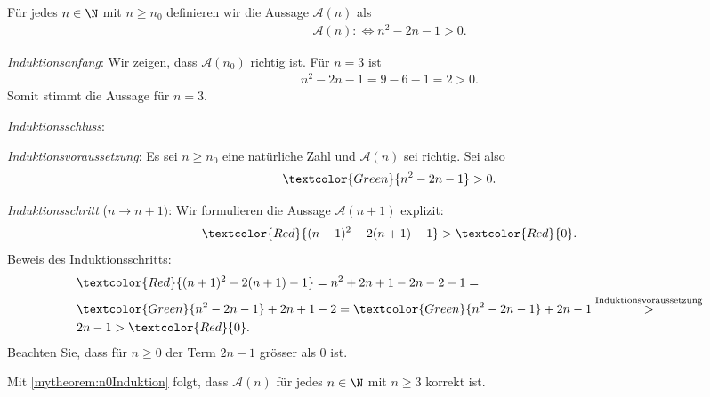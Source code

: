 \clearpage
\begin{myanswer}[myexercise:0292]
	Für jedes $n\in\N$ mit $n\geq n_0$ definieren wir die Aussage $\mathcal{A}(n)$ als
	\begin{align*}
		\mathcal{A}(n) :\iff n^2-2n-1 > 0.
	\end{align*}
	\begin{aenum}
		\item \textit{Induktionsanfang}: Wir zeigen, dass $\mathcal{A}(n_0)$ richtig ist. Für $n=3$ ist
		\begin{align*}
			n^2-2n-1 = 9-6-1 = 2 > 0.
		\end{align*}
		Somit stimmt die Aussage für $n=3$.
		\item \textit{Induktionsschluss}:
		\begin{renum}
			\item \textit{Induktionsvoraussetzung}: Es sei $n\geq n_0$ eine natürliche Zahl und $\mathcal{A}(n)$ sei richtig. Sei also
			\begin{align*}
				\textcolor{Green}{n^2-2n-1} > 0.
			\end{align*}
			\item \textit{Induktionsschritt} ($n\to n+1)$: Wir formulieren die Aussage $\mathcal{A}(n+1)$ explizit:
				\begin{align*}
					\textcolor{Red}{(n+1)^2-2(n+1)-1} > \textcolor{Red}{0}.
				\end{align*}
				Beweis des Induktionsschritts:
				\begin{align*}
					 & \textcolor{Red}{(n+1)^2-2(n+1)-1} = n^2 + 2n + 1 - 2n - 2 - 1 =                                                        \\
					 & \textcolor{Green}{n^2-2n-1} + 2n+1-2 = \textcolor{Green}{n^2-2n-1} + 2n-1 \stackrel{\text{Induktionsvoraussetzung}}{>} \\
					 & 2n-1 > \textcolor{Red}{0}.
				\end{align*}
				Beachten Sie, dass für $n\geq 0$ der Term $2n-1$ grösser als $0$ ist.
		\end{renum}
	\end{aenum}
	Mit \cref{mytheorem:n0Induktion} folgt, dass $\mathcal{A}(n)$ für jedes $n\in\N$ mit $n\geq 3$ korrekt ist.
\end{myanswer}

